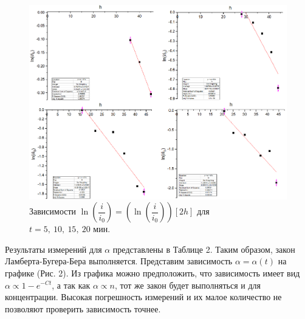 \documentclass[a4paper,12pt]{article}
\begin{document}
\begin{figure}
\includegraphics[scale=0.4]{2.png}
\centering
\caption{Зависимости $\ln\left( \dfrac{i}{i_0} \right) = \left(\ln\left( \dfrac{i}{i_0} \right)\right) [2h]$ для $t = 5,~10,~15,~20 \text{ мин}$.}
\end{figure}
Результаты измерений для $\alpha$ представлены в Таблице 2. Таким образом, закон Ламберта-Бугера-Бера выполняется. Представим зависимость $\alpha = \alpha(t)$ на графике (Рис. 2). Из графика можно предположить, что зависимость имеет вид $\alpha \propto 1 - e^{-Ct}$, а так как $\alpha \propto n$, тот же закон будет выполняться и для концентрации. Высокая погрешность измерений и их малое количество не позволяют проверить зависимость точнее.
\end{document}
